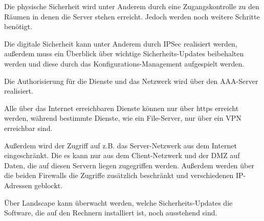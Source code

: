 Die physische Sicherheit wird unter Anderem durch eine Zugangskontrolle zu den Räumen in denen die Server stehen erreicht. Jedoch werden noch weitere Schritte benötigt.

Die digitale Sicherheit kann unter Anderem durch IPSec realisiert werden, außerdem muss ein Überblick über wichtige Sicherheits-Updates beibehalten werden und diese durch das Konfigurations-Management aufgespielt werden.

Die Authorisierung für die Dienste und das Netzwerk wird über den AAA-Server realisiert.

Alle über das Internet erreichbaren Dienste können nur über https erreicht werden, während bestimmte Dienste, wie ein File-Server, nur über ein VPN erreichbar sind.

Außerdem wird der Zugriff auf z.B. das Server-Netzwerk aus dem Internet eingeschränkt. Die es kann nur aus dem Client-Netzwerk und der DMZ auf Daten, die auf diesen Servern liegen zugegriffen werden. Außerdem werden über die beiden Firewalls die Zugriffe zusätzlich beschränkt und verschiedenen IP-Adressen geblockt.

Über Landscape kann überwacht werden, welche Sicherheits-Updates die Software, die auf den Rechnern installiert ist, noch ausstehend sind.
